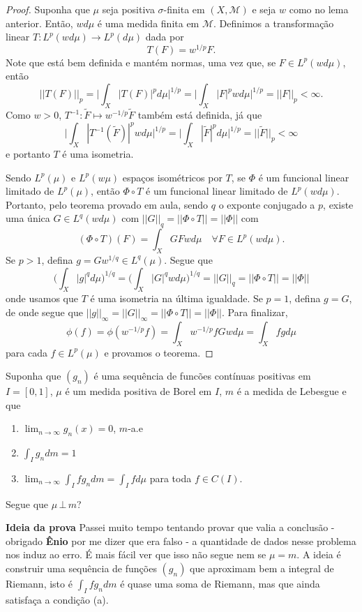 \begin{proof}
    Suponha que $\mu$ seja positiva $\sigma$-finita em $(X, \mathcal{M})$ e seja $w$ como no lema anterior. Então, $wd\mu$ é uma medida
    finita em $\mathcal{M}$. Definimos a transformação linear $T: L^p(wd\mu) \to L^p(d\mu)$ dada por 
    $$T(F) = w^{1/p}F.$$
    Note que está bem definida e mantém normas, uma vez que, se $F \in L^p(wd\mu)$, então 
    $$||T(F)||_p = \bigg|\int_X |T(F)|^p d\mu\bigg|^{1/p} = \bigg|\int_X |F|^p wd\mu\bigg|^{1/p} = ||F||_p < \infty.$$
    Como $w > 0$, $T^{-1}: \tilde{F} \mapsto w^{-1/p}\tilde{F}$ também está definida, já que 
    $$\bigg|\int_X |T^{-1}(\tilde{F})|^p wd\mu\bigg|^{1/p} = \bigg|\int_X |\tilde{F}|^p d\mu\bigg|^{1/p} = ||\tilde{F}||_p < \infty $$
    e portanto $T$ é uma isometria. 
    
    Sendo $L^p(\mu)$ e $L^p(w\mu)$ espaços isométricos por $T$, se $\Phi$ é um funcional linear limitado de $L^p(\mu)$, então $\Phi \circ T$ é um funcional linear limitado de $L^p(wd\mu)$.
    Portanto, pelo teorema provado em aula, sendo $q$ o exponte conjugado a $p$,  existe uma única $G \in L^q(wd\mu)$ com $||G||_q = ||\Phi \circ T|| = ||\Phi||$ com 
    $$(\Phi \circ T) (F) = \int_X GF wd\mu \quad \forall F \in L^p(wd\mu).$$
    Se $p > 1$, defina $g = Gw^{1/q} \in L^q(\mu)$. Segue que 
    $$\bigg(\int_X |g|^q d\mu\bigg)^{1/q} = \bigg(\int_X |G|^q w d\mu\bigg)^{1/q} = ||G||_q = ||\Phi \circ T|| = ||\Phi||$$
    onde usamos que $T$ é uma isometria na última igualdade. Se $p = 1$, defina $g = G$,
    de onde segue que $||g||_\infty = ||G||_\infty = ||\Phi \circ T|| = ||\Phi||$. Para finalizar, 
    $$\phi(f) = \phi(w^{-1/p}f) = \int_X w^{-1/p}fGwd\mu = \int_X fg d\mu$$
    para cada $f \in L^p(\mu)$ e provamos o teorema.
\end{proof}

\begin{problem}
    \label{prob:l6:4}
    Suponha que $(g_n)$ é uma sequência de funcões contínuas positivas em $I = [0,1]$, $\mu$ é um medida positiva de Borel em $I$, $m$ é a medida de Lebesgue
    e que 
    \begin{enumerate}[label=(\alph*)]
        \item $\lim_{n\to\infty} g_n(x) = 0$, $m$-a.e
        \item $\int_I g_n dm = 1$
        \item $\lim_{n\to\infty} \int_I fg_ndm = \int_I fd\mu$ para toda $f \in C(I)$.
    \end{enumerate}
    Segue que $\mu\,\bot\,m$?
\end{problem}
\begin{remark}
    \textbf{Ideia da prova}
    Passei muito tempo tentando provar que valia a conclusão - obrigado \textbf{Ênio} por me dizer que era falso - a quantidade de dados nesse problema nos induz ao erro. É mais fácil ver 
    que isso não segue nem se $\mu = m$. 
    A ideia é construir uma sequência de funções $(g_n)$ que aproximam bem a integral de Riemann, isto é $\int_I fg_n dm$ é quase uma soma de Riemann,
    mas que ainda satisfaça a condição (a).
\end{remark}


